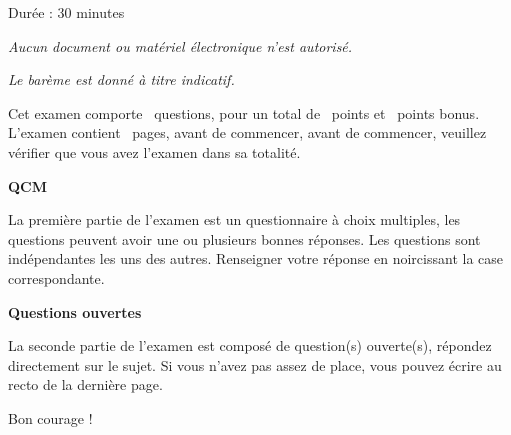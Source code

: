 \documentclass[12pt,a4paper,addpoints,answers]{exam}
\begin{document}
	
	\vspace*{2cm}
	
	\begin{center}
		
		Durée : 30 minutes
		
		\textit{Aucun document ou matériel électronique n’est autorisé.}
		
		\textit{Le barème est donné à titre indicatif.}
	\end{center}
	
	\vspace{1.5cm}
	\vspace{1.5cm}
	
	
	\begin{center}
		Cet examen comporte \numquestions\ questions, pour un total de \numpoints\ points et \numbonuspoints\ points bonus. L'examen contient \numpages\ pages, avant de commencer, avant de commencer, veuillez vérifier que vous avez l'examen dans sa totalité.
	\end{center}
	
	\vspace{1.5cm}
	
	\textbf{QCM}
	
	La première partie de l'examen est un questionnaire à choix multiples, les questions peuvent avoir une ou plusieurs bonnes réponses. Les questions sont indépendantes les uns des autres. Renseigner votre réponse en noircissant la case correspondante.
	
	\vspace{1.5cm}
	
	\textbf{Questions ouvertes}
	
	La seconde partie de l'examen est composé de question(s) ouverte(s), répondez directement sur le sujet. Si vous n'avez pas assez de place, vous pouvez écrire au recto de la dernière page.
	
	\vspace{1.5cm}
	
	\begin{center}
		Bon courage ! \blacksmiley{}
	\end{center}
	
	\newpage
	
	
%	
	
	
\end{document}
